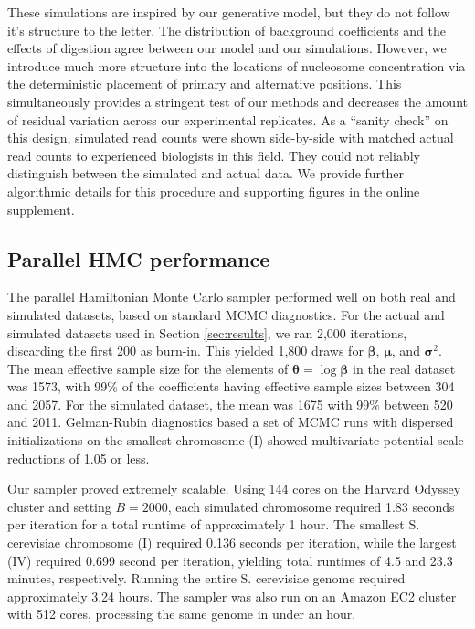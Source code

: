 These simulations are inspired by our generative model, but they do not follow it's structure to the letter.
The distribution of background coefficients and the effects of digestion agree between our model and our simulations.
However, we introduce much more structure into the locations of nucleosome concentration via the deterministic placement of primary and alternative positions.
This simultaneously provides a stringent test of our methods and decreases the amount of residual variation across our experimental replicates.
As a ``sanity check'' on this design, simulated read counts were shown side-by-side with matched actual read counts to experienced biologists in this field.
They could not reliably distinguish between the simulated and actual data.
We provide further algorithmic details for this procedure and supporting figures in the online supplement. %

\subsection{Parallel HMC performance}
\label{sec:mcmcPerformance}

The parallel Hamiltonian Monte Carlo sampler performed well on both real and simulated datasets, based on standard MCMC diagnostics.
For the actual and simulated datasets used in Section \ref{sec:results}, we ran 2,000 iterations, discarding the first 200 as burn-in.
This yielded 1,800 draws for $\bm \beta$, $\bm \mu$, and $\bm \sigma^2$.
The mean effective sample size for the elements of $\bm \theta = \log \bm \beta$ in the real dataset was 1573, with 99\% of the coefficients having effective sample sizes between 304 and 2057.
For the simulated dataset, the mean was 1675 with 99\% between 520 and 2011.
Gelman-Rubin diagnostics based a set of MCMC runs with dispersed initializations on the smallest chromosome (I) showed multivariate potential scale reductions of 1.05 or less.

Our sampler proved extremely scalable.
Using 144 cores on the Harvard Odyssey cluster and setting $B = 2000$, each simulated chromosome required 1.83 seconds per iteration for a total runtime of approximately 1 hour.
The smallest S. cerevisiae chromosome (I) required 0.136 seconds per iteration, while the largest (IV) required 0.699 second per iteration, yielding total runtimes of 4.5 and 23.3 minutes, respectively.
Running the entire S. cerevisiae genome required approximately 3.24 hours.
The sampler was also run on an Amazon EC2 cluster with 512 cores, processing the same genome in under an hour.

